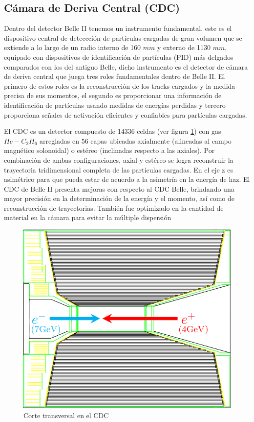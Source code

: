 \subsection{Cámara de Deriva Central (CDC)}
Dentro del detector Belle II tenemos un instrumento fundamental, este es el dispositivo central de deteccción de partículas cargadas de gran volumen que se extiende a lo largo de un radio interno de 160 \(mm\) y externo de 1130 \(mm\), equipado con dispositivos de identificación de partículas (PID) más delgados comparados con los del antiguo Belle, dicho instrumento es el detector de cámara de deriva central que juega tres roles fundamentales dentro de Belle II. El primero de estos roles es la reconstrucción de los tracks cargados y la medida precisa de sus momentos, el segundo es proporcionar una información de identificación de partículas usando medidas de energías perdidas y tercero proporciona señales de activación eficientes y confiables para partículas cargadas. 

El CDC es un detector compuesto de 14336 celdas (ver figura \ref{fig:cdc}) con gas \(He-C_{2}H_{6}\) arregladas en 56 capas ubicadas axialmente (alineadas al campo magnético solonoidal) o estéreo (inclinadas respecto a las axiales). Por combinación de ambas configuraciones, axial y estéreo se logra reconstruir la trayectoria tridimensional completa de las partículas cargadas. En el eje z es asimétrico para que pueda estar de acuerdo a la asimetría en la energía de haz. El CDC de Belle II presenta mejoras con respecto al CDC Belle, brindando una mayor precisión en la determinación de la energía y el momento, así como de reconstrucción de trayectorias. También fue optimizado en la cantidad de material en la cámara para evitar la múltiple dispersión
\begin{figure}[h]
    \centering
    \includegraphics[scale=.5]{Images/CDC.png}
    \caption{\small Corte transversal en el CDC}
    \label{fig:cdc}
\end{figure}

